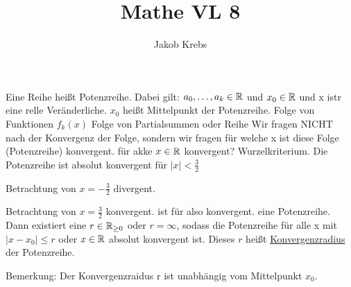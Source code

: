\documentclass{../tudscript}
\author{Jakob Krebs}
\title{Mathe VL 8}
\begin{document}
        Eine Reihe
        heißt Potenzreihe. Dabei gilt: $a_0, \ldots, a_k \in \mathbb{R}$ und 
        $x_0 \in \mathbb{R}$ und x istr eine relle Veränderliche.
        $x_0$ heißt Mittelpunkt der Potenzreihe.
        Folge von Funktionen $f_k (x)$
        Folge von Partialsummen oder Reihe
        Wir fragen NICHT nach der Konvergenz der Folge, sondern wir fragen
        für welche x ist diese Folge (Potenzreihe) konvergent.
        für akke $x \in \mathbb{R}$ konvergent?
        Wurzelkriterium.
        Die Potenzreihe ist absolut konvergent für $|x| < \frac{3}{2}$
        
        Betrachtung von $x= - \frac{3}{2}$
        divergent.

        Betrachtung von $x= \frac{3}{2}$
        konvergent.
        ist für 
        also konvergent.
        eine Potenzreihe. Dann existiert eine $r \in \mathbb{R}_{\geq 0}$ oder $r = \infty$, sodass
        die Potenzreihe für alle x mit $|x-x_0| \leq r$ oder $x \in \mathbb{R}$ absolut konvergent ist.
        Dieses $r$ heißt \underline{Konvergenzradius} der Potenzreihe.
        
        Bemerkung: Der Konvergenzraidus r ist unabhängig vom Mittelpunkt $x_0$.
        
\end{document}
